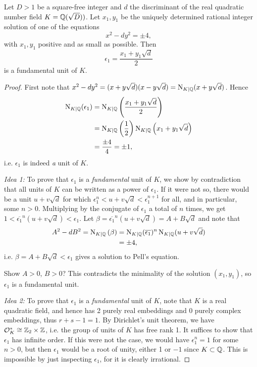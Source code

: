 \begin{proposition}
	Let $D>1$ be a square-free integer and $d$ the discriminant of the real quadratic number field $K=\mathbb{Q}(\sqrt{D}))$. Let $x_1,y_1$ be the uniquely determined rational integer solution of one of the equations
	\[
		x^2-dy^2=\pm 4,
	\]
	with $x_1,y_1$ positive and as small as possible. Then
	\[
		\epsilon_1 = \frac{x_1+y_1\sqrt{d}}{2}
	\]
	is a fundamental unit of $K$.
\end{proposition}
\begin{proof}
	First note that $x^2-dy^2=(x+y\sqrt{d})(x-y\sqrt{d})=\operatorname{N}_{K\mid\mathbb{Q}}(x+y\sqrt{d})$. Hence
	\begin{align*}
		\operatorname{N}_{K\mid\mathbb{Q}}(\epsilon_1)&=\operatorname{N}_{K\mid\mathbb{Q}}\left(\frac{x_1+y_1\sqrt{d}}{2}\right)\\
			&= \operatorname{N}_{K\mid\mathbb{Q}}\left(\frac{1}{2}\right)\operatorname{N}_{K\mid\mathbb{Q}}\left(x_1+y_1\sqrt{d}\right)\\
			&= \frac{\pm 4}{4} = \pm 1,
	\end{align*}
	i.e. $\epsilon_1$ is indeed \emph{a} unit of $K$.

	\emph{Idea 1:} To prove that $\epsilon_1$ is a \emph{fundamental} unit of $K$, we show by contradiction that all units of $K$ can be written as a power of $\epsilon_1$. If it were not so, there would be a unit $u+v\sqrt{d}$ for which $\epsilon_1^n < u+v\sqrt{d} < \epsilon_1^{n+1}$ for all, and in particular, some $n>0$. Multiplying by the conjugate of $\epsilon_1$ a total of $n$ times, we get $1 < \overline{\epsilon_1}^n(u+v\sqrt{d}) < \epsilon_1$. Let $\beta = \overline{\epsilon_1}^n(u+v\sqrt{d}) = A+B\sqrt{d}$ and note that
	\begin{align*}
		A^2-dB^2 = \operatorname{N}_{K\mid\mathbb{Q}}\left(\beta\right) &= \operatorname{N}_{K\mid\mathbb{Q}}(\overline{\epsilon_1})^n \operatorname{N}_{K\mid\mathbb{Q}}(u+v\sqrt{d})\\
			&= \pm 4,
	\end{align*}
	i.e. $\beta=A+B\sqrt{d} < \epsilon_1$ gives a solution to Pell's equation.

	Show $A>0$, $B>0$? This contradicts the minimality of the solution $(x_1,y_1)$, so $\epsilon_1$ is a fundamental unit.

	\emph{Idea 2:} To prove that $\epsilon_1$ is a \emph{fundamental} unit of $K$, note that $K$ is a real quadratic field, and hence has 2 purely real embeddings and 0 purely complex embeddings, thus $r+s-1=1$. By Dirichlet's unit theorem, we have $\mathcal{O}^*_K \cong \mathbb{Z}_2\times\mathbb{Z}$, i.e. the group of units of $K$ has free rank 1. It suffices to show that $\epsilon_1$ has infinite order. If this were not the case, we would have $\epsilon_1^n=1$ for some $n>0$, but then $\epsilon_1$ would be a root of unity, either 1 or $-1$ since $K\subset\mathbb{Q}$. This is impossible by just inspecting $\epsilon_1$, for it is clearly irrational.
\end{proof}
